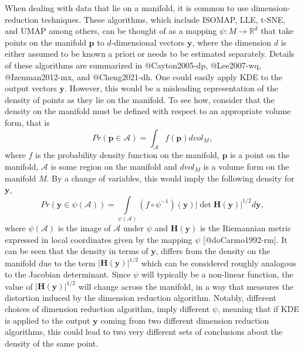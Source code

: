 \documentclass[
]{article}
\begin{document}
When dealing with data that lie on a manifold, it is common to use
dimension-reduction techniques. These algorithms, which include ISOMAP,
LLE, t-SNE, and UMAP among others, can be thought of as a mapping
\(\psi:M\rightarrow \mathbb{R}^d\) that take points on the manifold
\(\bm{p}\) to \(d\)-dimensional vectors \(\bm{y}\), where the dimension
\(d\) is either assumed to be known a priori or needs to be estimated
separately. Details of these algorithms are summarized in
@Cayton2005-dp, @Lee2007-wq, @Izenman2012-mx, and @Cheng2021-dh. One
could easily apply KDE to the output vectors \(\bm{y}\). However, this
would be a misleading representation of the density of points as they
lie on the manifold. To see how, consider that the density on the
manifold must be defined with respect to an appropriate volume form,
that is \[Pr(\bm{p}\in\mathcal{A})=\int_\mathcal{A} f(\bm{p}) dvol_M,\]
where \(f\) is the probability density function on the manifold,
\(\bm{p}\) is a point on the manifold, \(\mathcal{A}\) is some region on
the manifold and \(dvol_M\) is a volume form on the manifold \(M\). By a
change of variables, this would imply the following density for
\(\bm{y}\), \begin{equation}
\label{eq:changevar}
Pr(\bm{y}\in\psi(\mathcal{A}))=\int\limits_{\psi(\mathcal{A})} (f\circ\psi^{-1})(\bm{y})|\det \bm{H}(\bm{y})|^{1/2}d\bm{y},
\end{equation} where \(\psi(\mathcal{A})\) is the image of
\(\mathcal{A}\) under \(\psi\) and \(\bm{H}(\bm{y})\) is the Riemannian
metric expressed in local coordinates given by the mapping \(\psi\)
{[}@doCarmo1992-rm{]}. It can be seen that the density in terms of
\(\bm{y}\), differs from the density on the manifold due to the term
\(|\bm{H}(\bm{y})|^{1/2}\) which can be considered roughly analogous to
the Jacobian determinant. Since \(\psi\) will typically be a non-linear
function, the value of \(|\bm{H}(\bm{y})|^{1/2}\) will change across the
manifold, in a way that measures the distortion induced by the dimension
reduction algorithm. Notably, different choices of dimension reduction
algorithm, imply different \(\psi\), meaning that if KDE is applied to
the output \(\bm{y}\) coming from two different dimension reduction
algorithms, this could lead to two very different sets of conclusions
about the density of the same point.
\end{document}
